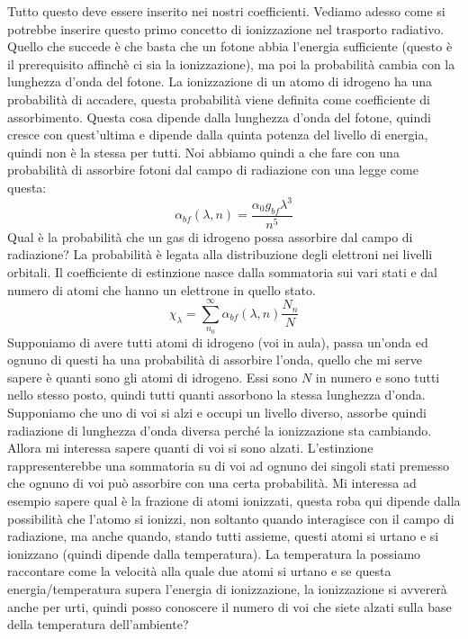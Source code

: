 \documentclass[a4paper,11pt]{article}
\begin{document}
Tutto questo deve essere inserito nei nostri coefficienti.
\newline
Vediamo adesso come si potrebbe inserire questo primo concetto di ionizzazione nel trasporto radiativo. Quello che succede è che basta che un fotone abbia l'energia sufficiente (questo è il prerequisito affinchè ci sia la ionizzazione), ma poi la probabilità cambia con la lunghezza d'onda del fotone.
\newline
La ionizzazione di un atomo di idrogeno ha una probabilità di accadere, questa probabilità viene definita come coefficiente di assorbimento. Questa cosa dipende dalla lunghezza d'onda del fotone, quindi cresce con quest'ultima e dipende dalla quinta potenza del livello di energia, quindi non è la stessa per tutti.
\newline
Noi abbiamo quindi a che fare con una probabilità di assorbire fotoni dal campo di radiazione con una legge come questa:
$$
\alpha_{bf}(\lambda,n)=\frac{\alpha_0 g_{bf} \lambda^3}{n^5}
$$
Qual è la probabilità che un gas di idrogeno possa assorbire dal campo di radiazione? La probabilità è legata alla distribuzione degli elettroni nei livelli orbitali.
\newline
Il coefficiente di estinzione nasce dalla sommatoria sui vari stati e dal numero di atomi che hanno un elettrone in quello stato.
 $$
    {\chi_{\lambda}} = \sum_{n_0}^{\infty} {\alpha_{bf}}({\lambda},n)\frac{N_n}{N}
    $$
Supponiamo di avere tutti atomi di idrogeno (voi in aula), passa un'onda ed ognuno di questi ha una probabilità di assorbire l'onda, quello che mi serve sapere è quanti sono gli atomi di idrogeno.
Essi sono $N$ in numero e sono tutti nello stesso posto, quindi tutti quanti assorbono la stessa lunghezza d'onda. Supponiamo che uno di voi si alzi e occupi un livello diverso, assorbe quindi radiazione di lunghezza d'onda diversa perché la ionizzazione sta cambiando. Allora mi interessa sapere quanti di voi si sono alzati.
\newline
L'estinzione rappresenterebbe una sommatoria su di voi ad ognuno dei singoli stati premesso che ognuno di voi può assorbire con una certa probabilità.
\newline
Mi interessa ad esempio sapere qual è la frazione di atomi ionizzati, questa roba qui dipende dalla possibilità che l'atomo si ionizzi, non soltanto quando interagisce con il campo di radiazione, ma anche quando, stando tutti assieme, questi atomi si urtano e si ionizzano (quindi dipende dalla temperatura). La temperatura la possiamo raccontare come la velocità alla quale due atomi si urtano e se questa energia/temperatura supera l'energia di ionizzazione, la ionizzazione si avvererà anche per urti, quindi posso conoscere il numero di voi che siete alzati sulla base della temperatura dell'ambiente?
\end{document}
